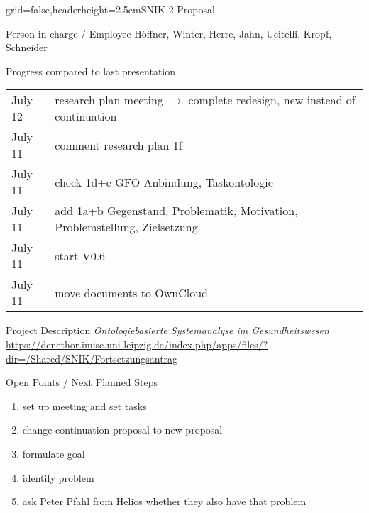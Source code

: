 \documentclass[english]{kiesgrube}
\begin{document}
\begin{poster}{grid=false,headerheight=2.5em}{}{SNIK 2 Proposal}{}{}
\begin{posterbox}[name=person,column=0,row=0]{Person in charge / Employee}
Höffner, Winter, Herre, Jahn, Ucitelli, Kropf, Schneider
\end{posterbox}
\begin{posterbox}[name=progress,below=person]{Progress compared to last presentation}
\begin{tabulary}{\textwidth}{lL}
July 12		&research plan meeting $\rightarrow$ complete redesign, new instead of continuation\\
July 11		&comment research plan 1f\\
July 11		&check 1d+e GFO-Anbindung, Taskontologie\\
July 11		&add 1a+b Gegenstand, Problematik, Motivation, Problemstellung, Zielsetzung\\
July 11		&start V0.6\\
July 11		&move documents to OwnCloud\\
\end{tabulary}
\end{posterbox}
\begin{posterbox}[name=description,column=1,row=0]{Project Description}
\emph{Ontologiebasierte Systemanalyse im Gesundheitswesen}
\url{https://denethor.imise.uni-leipzig.de/index.php/apps/files/?dir=/Shared/SNIK/Fortsetzungsantrag}
\end{posterbox}
\begin{posterbox}[name=open,column=1,below=description]{Open Points / Next Planned Steps}
\begin{enumerate}
\item set up meeting and set tasks
\item change continuation proposal to new proposal
\item formulate goal
\item identify problem
\item ask Peter Pfahl from Helios whether they also have that problem

\end{enumerate}
\end{posterbox}
\end{poster}
\end{document}
